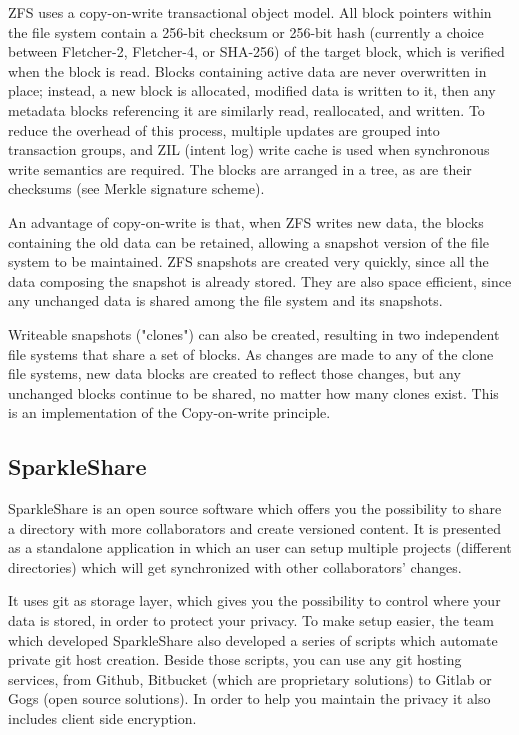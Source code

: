         ZFS uses a copy-on-write transactional object model. All block pointers within the file system contain a 256-bit checksum or 256-bit hash (currently a choice between Fletcher-2, Fletcher-4, or SHA-256) of the target block, which is verified when the block is read. Blocks containing active data are never overwritten in place; instead, a new block is allocated, modified data is written to it, then any metadata blocks referencing it are similarly read, reallocated, and written. To reduce the overhead of this process, multiple updates are grouped into transaction groups, and ZIL (intent log) write cache is used when synchronous write semantics are required. The blocks are arranged in a tree, as are their checksums (see Merkle signature scheme).

        An advantage of copy-on-write is that, when ZFS writes new data, the blocks containing the old data can be retained, allowing a snapshot version of the file system to be maintained. ZFS snapshots are created very quickly, since all the data composing the snapshot is already stored. They are also space efficient, since any unchanged data is shared among the file system and its snapshots.

        Writeable snapshots ("clones") can also be created, resulting in two independent file systems that share a set of blocks. As changes are made to any of the clone file systems, new data blocks are created to reflect those changes, but any unchanged blocks continue to be shared, no matter how many clones exist. This is an implementation of the Copy-on-write principle.

    \subsection{SparkleShare}
        SparkleShare is an open source software which offers you the possibility to share a directory with more collaborators and create versioned content. It is presented as a standalone application in which an user can setup multiple projects (different directories) which will get synchronized with other collaborators' changes.

        It uses git as storage layer, which gives you the possibility to control where your data is stored, in order to protect your privacy. To make setup easier, the team which developed SparkleShare also developed a series of scripts which automate private git host creation. Beside those scripts, you can use any git hosting services, from Github, Bitbucket (which are proprietary solutions) to Gitlab or Gogs (open source solutions).
        In order to help you maintain the privacy it also includes client side encryption.

